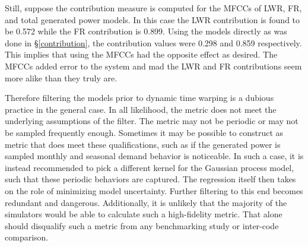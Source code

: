 Still, suppose the contribution measure is computed for the MFCCs of LWR, FR, and 
total generated power models.  In this case the LWR contribution is found to be 
0.572 while the FR contribution is 0.899. Using the models directly as was done 
in \S\ref{contribution}, the contribution values were 0.298 and 0.859 respectively.
This implies that using the MFCCs had the opposite effect as desired.  The MFCCs
added error to the system and mad the LWR and FR contributions seem more alike than 
they truly are.

Therefore filtering the models prior to dynamic time warping is a dubious practice
in the general case. In all likelihood, the metric does not meet the underlying 
assumptions of the filter. The metric may not be periodic or may not be sampled 
frequently enough. Sometimes it may be possible to construct as metric that does
meet these qualifications, such as if the generated power is sampled monthly and 
seasonal demand behavior is noticeable. In such a case, it is instead recommended
to pick a different kernel for the Gaussian process model, such that these 
periodic behaviors are captured.  The regression itself then takes on the role of 
minimizing model uncertainty. Further filtering to this end becomes redundant and
dangerous.  Additionally, it is unlikely that 
the majority of the simulators would be able to calculate such a high-fidelity metric.
That alone should disqualify such a metric from any benchmarking study or
inter-code comparison.
